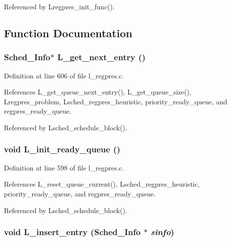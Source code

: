 Referenced by Lregpres\_\-init\_\-func().

\subsection{Function Documentation}
\subsubsection{\setlength{\rightskip}{0pt plus 5cm}\bf{Sched\_\-Info}$\ast$ L\_\-get\_\-next\_\-entry ()}\label{l__regpres_8c_0c02c6c4c315bd64ecf3c512ee700d87}




Definition at line 606 of file l\_\-regpres.c.

References L\_\-get\_\-queue\_\-next\_\-entry(), L\_\-get\_\-queue\_\-size(), Lregpres\_\-problem, Lsched\_\-regpres\_\-heuristic, priority\_\-ready\_\-queue, and regpres\_\-ready\_\-queue.

Referenced by Lsched\_\-schedule\_\-block().
\subsubsection{\setlength{\rightskip}{0pt plus 5cm}void L\_\-init\_\-ready\_\-queue ()}\label{l__regpres_8c_ce269a612036a7f00eed18771f53b4f4}




Definition at line 598 of file l\_\-regpres.c.

References L\_\-reset\_\-queue\_\-current(), Lsched\_\-regpres\_\-heuristic, priority\_\-ready\_\-queue, and regpres\_\-ready\_\-queue.

Referenced by Lsched\_\-schedule\_\-block().
\subsubsection{\setlength{\rightskip}{0pt plus 5cm}void L\_\-insert\_\-entry (\bf{Sched\_\-Info} $\ast$ {\em sinfo})}\label{l__regpres_8c_3774dee00a536b57c57645d709df23fe}




